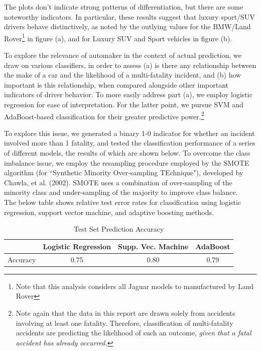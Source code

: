 \documentclass[11pt, oneside,titlepage]{article}   	%
\begin{document}
The plots don't indicate strong patterns of differentiation, but there are some noteworthy indicators. In particular, these results suggest that luxury sport/SUV drivers behave distinctively, as noted by the outlying values for the BMW/Land Rover\footnote{Note that this analysis considers all Jaguar models to manufactured by Land Rover} in figure (a), and for Luxury SUV and Sport vehicles in figure (b).

To explore the relevance of automaker in the context of actual prediction, we draw on various classifiers, in order to assess (a) is there any relationship between the make of a car and the likelihood of a multi-fatality incident, and (b) how important is this relationship, when compared alongside other important indicators of driver behavior. To more easily address part (a), we employ logistic regression for ease of interpretation. For the latter point, we pursue SVM and AdaBoost-based classification for their greater predictive power.\footnote{Note again that the data in this report are drawn solely from accidents involving at least one fatality. Therefore, classification of multi-fatality accidents are predicting the likelihood of such an outcome, \textit{given that a fatal accident has already occurred.}}

To explore this issue, we generated a binary 1-0 indicator for whether an incident involved more than 1 fatality, and tested the classification performance of a series of different models, the results of which are shown below. To overcome the class imbalance issue, we employ the resampling procedure employed by the SMOTE algorithm (for ``Synthetic Minority Over-sampling TEchnique"), developed by Chawla, et al. (2002). SMOTE uses a combination of over-sampling of the minority class and under-sampling of the majority to improve class balance.\\

The below table shows relative test error rates for classification using logistic regression, support vector machine, and adaptive boosting methods. \\

\begin{table}[H]
\centering
\begin{tabular}{cccc}
  \hline
 & Logistic Regression & Supp. Vec. Machine & AdaBoost \\ 
  \hline
Accuracy & 0.75 & 0.80 & 0.79 \\ 
   \hline
\end{tabular}
\caption{Test Set Prediction Accuracy} 
\end{table}
\end{document}
